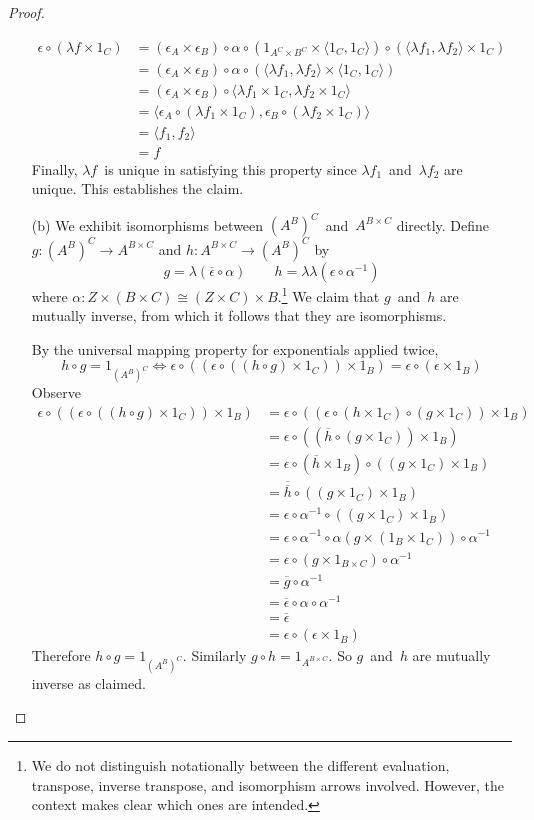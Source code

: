 \documentclass[letterpaper,12pt]{article}
\newcommand{\iso}{\cong}
\newcommand{\after}{\circ}
\newcommand{\eval}{\epsilon}
\newcommand{\pair}[2]{\langle{#1},{#2}\rangle}
\newcommand{\inv}[1]{#1^{-1}}
\newcommand{\curry}[1]{\lambda{#1}}
\newcommand{\uncurry}[1]{\overline{#1}}
\newcommand{\2}{\cat{2}}
\theoremstyle{definition}
\theoremstyle{remark}
\theoremstyle{direction}
\begin{document}
\begin{proof}
\begin{enumerate}[itemsep=0pt]
\begin{align*}
\eval\after(\curry{f}\times1_C)&=(\eval_A\times\eval_B)\after\alpha\after(1_{A^C\times B^C}\times\pair{1_C}{1_C})\after(\pair{\curry{f_1}}{\curry{f_2}}\times1_C)\\
	&=(\eval_A\times\eval_B)\after\alpha\after(\pair{\curry{f_1}}{\curry{f_2}}\times\pair{1_C}{1_C})\\
	&=(\eval_A\times\eval_B)\after\pair{\curry{f_1}\times1_C}{\curry{f_2}\times1_C}\\
	&=\pair{\eval_A\after(\curry{f_1}\times1_C)}{\eval_B\after(\curry{f_2}\times1_C)}\\
	&=\pair{f_1}{f_2}\\
	&=f
\end{align*}
Finally, \(\curry{f}\)~is unique in satisfying this property since \(\curry{f_1}\)~and~\(\curry{f_2}\) are unique. This establishes the claim.
\item[(b)] We exhibit isomorphisms between \((A^B)^C\)~and~\(A^{B\times C}\) directly. Define \(g:(A^B)^C\to A^{B\times C}\) and \(h:A^{B\times C}\to(A^B)^C\) by
\[g=\curry{(\uncurry{\eval}\after\alpha)}\qquad h=\curry{\curry{(\eval\after\inv{\alpha})}}\]
where \(\alpha:Z\times(B\times C)\iso(Z\times C)\times B\).\footnote{We do not distinguish notationally between the different evaluation, transpose, inverse transpose, and isomorphism arrows involved. However, the context makes clear which ones are intended.} We claim that \(g\)~and~\(h\) are mutually inverse, from which it follows that they are isomorphisms.

By the universal mapping property for exponentials applied twice,
\[h\after g=1_{(A^B)^C}\iff\eval\after((\eval\after((h\after g)\times 1_C))\times 1_B)=\eval\after(\eval\times 1_B)\]
Observe
\begin{align*}
\eval\after((\eval\after((h\after g)\times 1_C))\times 1_B)&=\eval\after((\eval\after(h\times1_C)\after(g\times1_C))\times 1_B)\\
	&=\eval\after((\uncurry{h}\after(g\times1_C))\times 1_B)\\
	&=\eval\after(\uncurry{h}\times1_B)\after((g\times1_C)\times1_B)\\
	&=\uncurry{\uncurry{h}}\after((g\times1_C)\times1_B)\\
	&=\eval\after\inv{\alpha}\after((g\times1_C)\times1_B)\\
	&=\eval\after\inv{\alpha}\after\alpha(g\times(1_B\times1_C))\after\inv{\alpha}\\
	&=\eval\after(g\times1_{B\times C})\after\inv{\alpha}\\
	&=\uncurry{g}\after\inv{\alpha}\\
	&=\uncurry{\eval}\after\alpha\after\inv{\alpha}\\
	&=\uncurry{\eval}\\
	&=\eval\after(\eval\times1_B)
\end{align*}
Therefore \(h\after g=1_{(A^B)^C}\). Similarly \(g\after h=1_{A^{B\times C}}\). So \(g\)~and~\(h\) are mutually inverse as claimed.\qedhere
\end{enumerate}
\end{proof}
\end{document}
